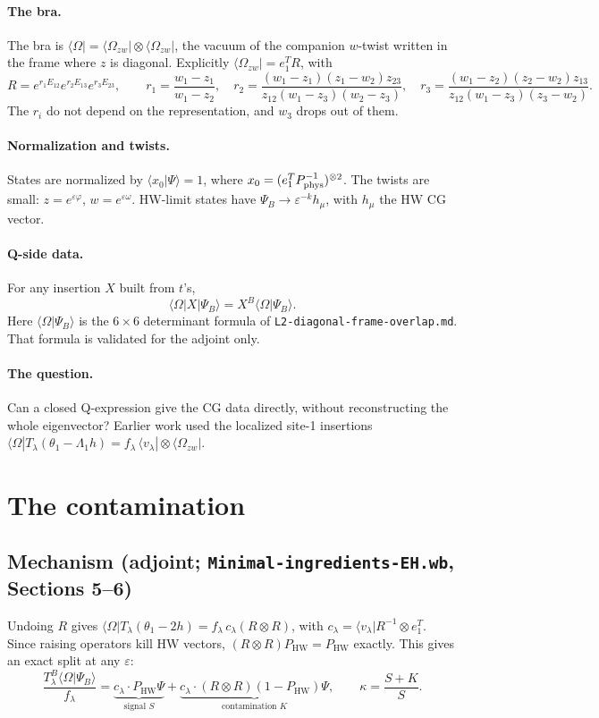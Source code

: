 \documentclass[11pt]{article}
\newcommand{\bra}[1]{\langle #1|}
\newcommand{\ket}[1]{|#1\rangle}
\newcommand{\Om}{\Omega}
\newcommand{\HW}{\mathrm{HW}}
\newcommand{\eps}{\varepsilon}
\begin{document}
\paragraph{The bra.} The bra is $\bra{\Om}=\bra{\Om_{zw}}\otimes\bra{\Om_{zw}}$, the vacuum of the companion $w$-twist written in the frame where $z$ is diagonal. Explicitly $\bra{\Om_{zw}}=e_1^TR$, with
\[
R=e^{r_1E_{12}}e^{r_2E_{13}}e^{r_3E_{23}},\qquad
r_1=\frac{w_1-z_1}{w_1-z_2},\quad
r_2=\frac{(w_1-z_1)(z_1-w_2)z_{23}}{z_{12}(w_1-z_3)(w_2-z_3)},\quad
r_3=\frac{(w_1-z_2)(z_2-w_2)z_{13}}{z_{12}(w_1-z_3)(z_3-w_2)}.
\]
The $r_i$ do not depend on the representation, and $w_3$ drops out of them.

\paragraph{Normalization and twists.} States are normalized by $\langle x_0|\Psi\rangle=1$, where $x_0=(e_1^TP_{\rm phys}^{-1})^{\otimes2}$. The twists are small: $z=e^{\eps\varphi}$, $w=e^{\eps\omega}$. HW-limit states have $\Psi_B\to\eps^{-k}h_\mu$, with $h_\mu$ the HW CG vector.

\paragraph{Q-side data.} For any insertion $X$ built from $t$'s,
\[
\bra{\Om}X\ket{\Psi_B}=X^B\langle\Om|\Psi_B\rangle .
\]
Here $\langle\Om|\Psi_B\rangle$ is the $6\times6$ determinant formula of \texttt{L2-diagonal-frame-overlap.md}. That formula is validated for the adjoint only.

\paragraph{The question.} Can a closed Q-expression give the CG data directly, without reconstructing the whole eigenvector? Earlier work used the localized site-1 insertions $\bra\Om T_\lambda(\theta_1-\Lambda_1h)=f_\lambda\,\bra{v_\lambda}\otimes\bra{\Om_{zw}}$.

\section{The contamination}

\subsection{Mechanism (adjoint; \texttt{Minimal-ingredients-EH.wb}, Sections 5--6)}
Undoing $R$ gives $\bra\Om T_\lambda(\theta_1-2h)=f_\lambda\,c_\lambda(R\otimes R)$, with $c_\lambda=\bra{v_\lambda}R^{-1}\otimes e_1^T$. Since raising operators kill HW vectors, $(R\otimes R)P_\HW=P_\HW$ exactly. This gives an exact split at any $\eps$:
\[
\frac{T^B_\lambda\langle\Om|\Psi_B\rangle}{f_\lambda}
=\underbrace{c_\lambda\cdot P_\HW\Psi}_{\text{signal }S}
+\underbrace{c_\lambda\cdot(R\otimes R)(1-P_\HW)\Psi}_{\text{contamination }K},
\qquad \kappa=\frac{S+K}{S}.
\]
\end{document}
